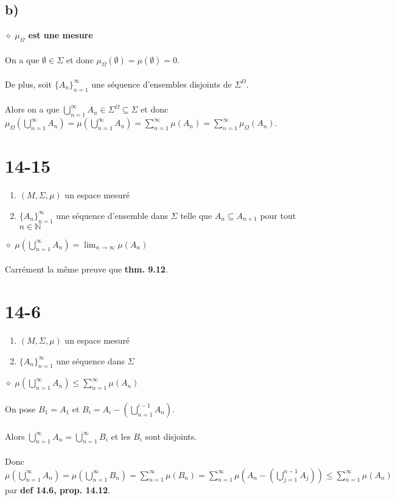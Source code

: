 \documentclass[a4paper,10pt]{article}
\begin{document}
\subsection*{b)}
$\diamond$ \textbf{$\mu_\Omega$ est une mesure}
\\
\\
On a que $\emptyset \in \Sigma$ et donc $\mu_\Omega (\emptyset) = \mu (\emptyset) = 0$.
\\
\\
De plus, soit $\{A_n\}_{n=1}^\infty$ une séquence d'ensembles disjoints de $\Sigma^\Omega$.
\\
\\
Alors on a que $\bigcup_{n=1}^\infty A_n \in \Sigma^\Omega \subseteq \Sigma$ et donc $\mu_\Omega (\bigcup_{n=1}^\infty A_n ) = \mu (\bigcup_{n=1}^\infty A_n) = \sum_{n=1}^\infty \mu (A_n) = \sum_{n=1}^\infty \mu_\Omega (A_n)$.

\section*{14-15}
\begin{enumerate}
	\item $(M, \Sigma, \mu)$ un espace mesuré
	\item $\{A_n\}_{n=1}^\infty$ une séquence d'ensemble dans $\Sigma$ telle que $A_n \subseteq A_{n+1}$ pour tout $n \in \mathbb{N}$
\end{enumerate}
$\diamond$ \textbf{$\mu (\bigcup_{n=1}^\infty A_n) = \lim_{n \to \infty} \mu (A_n)$}
\\
\\
Carrément la même preuve que \textbf{thm. 9.12}.

\section*{14-6}
\begin{enumerate}
	\item $(M, \Sigma, \mu)$ un espace mesuré
	\item $\{A_n\}_{n=1}^\infty$ une séquence dans $\Sigma$
\end{enumerate}
$\diamond$ \textbf{$\mu (\bigcup_{n=1}^\infty A_n) \leq \sum_{n=1}^\infty \mu(A_n)$}
\\
\\
On pose $B_1 = A_1$ et $B_i = A_i - (\bigcup_{n=1}^{i-1}A_n)$.
\\
\\
Alors $\bigcup_{n=1}^\infty A_n = \bigcup_{n=1}^\infty B_i$ et les $B_i$ sont disjoints.
\\
\\
Donc $\mu (\bigcup_{n=1}^\infty A_n) = \mu (\bigcup_{n=1}^\infty B_n) = \sum_{n=1}^\infty \mu(B_n) = \sum_{n=1}^\infty \mu(A_n - (\bigcup_{j=1}^{n-1} A_j)) \leq \sum_{n=1}^\infty \mu(A_n)$ par \textbf{def 14.6, prop. 14.12}.
\end{document}
